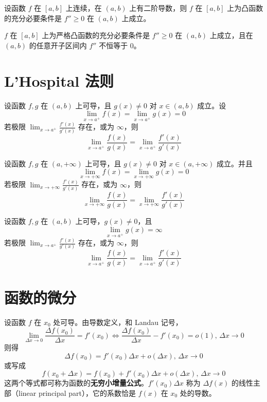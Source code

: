 \begin{theorem}
  设函数 $f$ 在 $[a,b]$ 上连续，在 $(a,b)$ 上有二阶导数，则 $f$ 在 $[a,b]$ 上为凸函数的充分必要条件是 $f'' \geqslant 0$ 在 $(a,b)$ 上成立。

  $f$ 在 $[a,b]$ 上为严格凸函数的充分必要条件是 $f'' \geqslant 0$ 在 $(a,b)$ 上成立，且在 $(a,b)$ 的任意开子区间内 $f''$ 不恒等于 $0$。
\end{theorem}

\section{L'Hospital 法则}

\begin{theorem}
  设函数 $f,g$ 在 $(a,b)$ 上可导，且 $g(x) \ne 0$ 对 $x \in (a,b)$ 成立。设
  \[\lim_{x \to a^{+}}f(x) = \lim_{x \to a^{+}}g(x) = 0\]
  若极限  $\displaystyle \lim_{x \to a^{+}}\frac{f'(x)}{g'(x)}$ 存在，或为 $\infty$，则
  \[\lim_{x \to a^{+}}\frac{f(x)}{g(x)} = \lim_{x \to a^{+}}\frac{f'(x)}{g'(x)}\]
\end{theorem}

\begin{theorem}
  设函数 $f,g$ 在 $(a,+\infty)$ 上可导，且 $g(x) \ne 0$ 对 $x \in (a,+\infty)$ 成立。并且
  \[\lim_{x \to +\infty}f(x) = \lim_{x \to +\infty}g(x) = 0\]
  若极限 $\displaystyle \lim_{x \to +\infty}\frac{f'(x)}{g'(x)}$ 存在，或为 $\infty$，则
  \[\lim_{x \to +\infty}\frac{f(x)}{g(x)} = \lim_{x \to +\infty}\frac{f'(x)}{g'(x)}\]
\end{theorem}

\begin{theorem}
  设函数 $f,g$ 在 $(a,b)$ 上可导，$g(x) \ne 0$，且
  \[ \lim_{x \to a^{+}}g(x) = \infty\]
  若极限  $\displaystyle \lim_{x \to a^{+}}\frac{f'(x)}{g'(x)}$ 存在，或为 $\infty$，则
  \[\lim_{x \to a^{+}}\frac{f(x)}{g(x)} = \lim_{x \to a^{+}}\frac{f'(x)}{g'(x)}\]
\end{theorem}



\section{函数的微分}

设函数 $f$ 在 $x_0$ 处可导。由导数定义，和 Landau 记号，
\[\lim_{\Delta x\to 0}\frac{\Delta f(x_0)}{\Delta x} = f'(x_0) \iff \frac{\Delta f(x_0)}{\Delta x} - f'(x_0) = o(1),\, \Delta x\to 0\]
则得
\begin{equation}
  \Delta f(x_0) = f'(x_0)\Delta x + o(\Delta x),\, \Delta x\to 0
\end{equation}
或写成
\begin{equation}
  f(x_0 + \Delta x) = f(x_0) + f'(x_0)\Delta x + o(\Delta x),\, \Delta x\to 0
\end{equation}
这两个等式都可称为函数的\textbf{无穷小增量公式}。$f'(x_0)\Delta x$ 称为 $\Delta f(x)$ 的线性主部（linear principal part），它的系数恰是 $f(x)$ 在 $x_0$ 处的导数。

